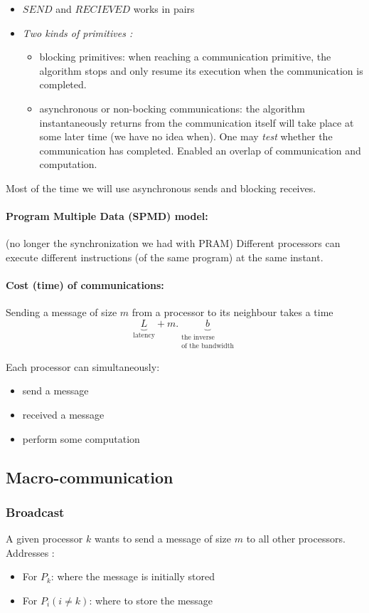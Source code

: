 \begin{itemize}
\item $SEND$ and $RECIEVED$ works in pairs
\item \emph{Two kinds of primitives :}
\begin{itemize}
\item blocking primitives: when reaching a communication primitive, the algorithm stops and only resume its execution when the communication is completed.
\item asynchronous or non-bocking communications: the algorithm instantaneously returns from the communication itself will take place at some later time (we have no idea when). One may \emph{test} whether  the communication has completed. Enabled an overlap of communication and computation.
\end{itemize}
\end{itemize}

Most of the time we will use asynchronous sends and blocking receives.

\paragraph{Program Multiple Data (SPMD) model:} (no longer the synchronization we had with PRAM) Different processors can execute different instructions (of the same program) at the same instant.

\paragraph{Cost (time) of communications:} Sending a message of size $m$ from a processor to its neighbour takes a time
\[\underbrace{L}_{\text{latency}}+m.\underbrace{b}_{\substack{\text{the inverse}\\ \text{of the bandwidth}}}\]

Each processor can simultaneously:
\begin{itemize}
\item send a message
\item received a message
\item perform some computation
\end{itemize}

\subsection{Macro-communication}
\subsubsection{Broadcast}
A given processor $k$ wants to send a message of size $m$ to all other processors.
Addresses :
\begin{itemize}
\item For $P_k$: where the message is initially stored
\item For $P_i (i\neq k)$: where to store the message
\end{itemize}

